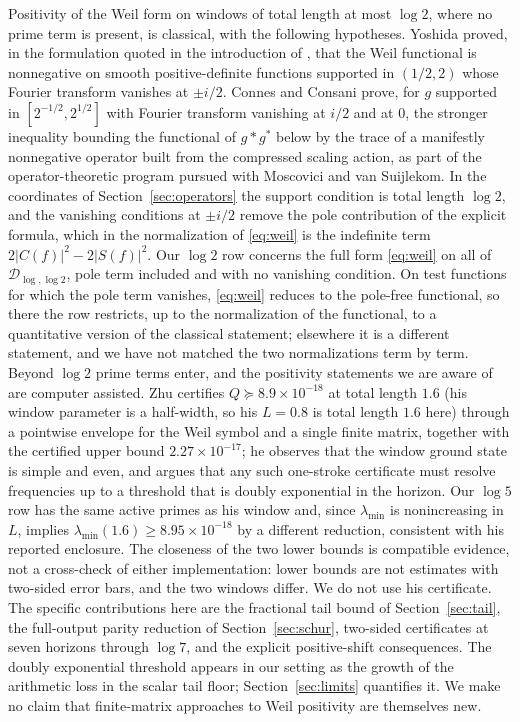 \documentclass[11pt]{article}
\numberwithin{equation}{section}
\theoremstyle{definition}
\theoremstyle{remark}
\newcommand{\DD}{\mathcal D}
\begin{document}
Positivity of the Weil form on windows of total length at most $\log2$, where
no prime term is present, is classical, with the following hypotheses. Yoshida
\cite{Yoshida1992} proved, in the formulation quoted in the introduction of
\cite{ConnesConsani2020}, that the Weil functional is nonnegative on smooth
positive-definite functions supported in $(1/2,2)$ whose Fourier transform
vanishes at $\pm i/2$. Connes and Consani \cite[Theorem~1]{ConnesConsani2020}
prove, for $g$ supported in $[2^{-1/2},2^{1/2}]$ with Fourier transform
vanishing at $i/2$ and at $0$, the stronger inequality bounding the functional
of $g*g^*$ below by the trace of a manifestly nonnegative operator built from
the compressed scaling action, as part of the operator-theoretic program
pursued with Moscovici and van Suijlekom. In the coordinates of
Section~\ref{sec:operators} the support condition is total length $\log2$,
and the vanishing conditions at $\pm i/2$ remove the pole contribution of the
explicit formula, which in the normalization of \eqref{eq:weil} is the
indefinite term $2|C(f)|^2-2|S(f)|^2$. Our $\log2$ row concerns the full form
\eqref{eq:weil} on all of $\DD_{\log,\log2}$, pole term included and with no
vanishing condition. On test functions for which the pole term vanishes,
\eqref{eq:weil} reduces to the pole-free functional, so there the row
restricts, up to the normalization of the functional, to a quantitative
version of the classical statement; elsewhere it is a different statement,
and we have not matched the two normalizations term by term.
Beyond $\log2$ prime terms enter, and the positivity statements we are aware
of are computer assisted. Zhu \cite{Zhu2026} certifies
$Q\succeq8.9\times10^{-18}$ at total length $1.6$ (his window parameter is a
half-width, so his $L=0.8$ is total length $1.6$ here) through a pointwise
envelope for the Weil symbol and a single finite matrix, together with the
certified upper bound $2.27\times10^{-17}$; he observes that the window ground
state is simple and even, and argues that any such one-stroke certificate must
resolve frequencies up to a threshold that is doubly exponential in the
horizon. Our $\log5$ row has the same active primes as his window and, since
$\lambda_{\min}$ is nonincreasing in $L$, implies
$\lambda_{\min}(1.6)\ge8.95\times10^{-18}$ by a different reduction, consistent
with his reported enclosure. The closeness of the two lower bounds is
compatible evidence, not a cross-check of either implementation: lower bounds
are not estimates with two-sided error bars, and the two windows differ. We do
not use his certificate. The specific contributions here
are the fractional tail bound of Section~\ref{sec:tail}, the full-output
parity reduction of Section~\ref{sec:schur}, two-sided certificates at seven
horizons through $\log7$, and the explicit positive-shift consequences. The
doubly exponential threshold appears in our setting as the growth of the
arithmetic loss in the scalar tail floor; Section~\ref{sec:limits} quantifies
it. We make no claim that finite-matrix approaches to Weil positivity are
themselves new.
\end{document}

